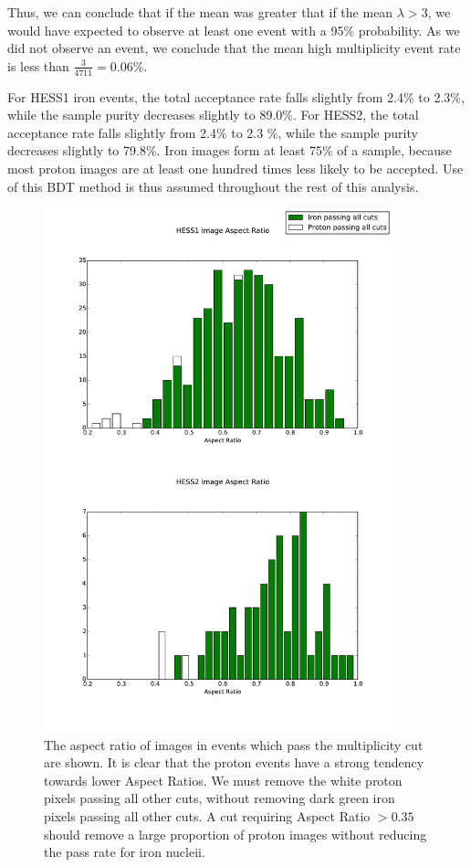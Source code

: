 \documentclass[11pt]{article}
\begin{document}
Thus, we can conclude that if the mean was greater that if the mean $\lambda>3$, we would have expected to observe at least one event with a 95\% probability. As we did not observe an event, we conclude that the mean high multiplicity event rate is less than $\frac{3}{4711}=0.06\%$. 

For HESS1 iron events, the total acceptance rate falls slightly from 2.4\% to 2.3\%, while the sample purity decreases slightly to 89.0\%. For HESS2, the total acceptance rate falls slightly from 2.4\% to 2.3 \%, while the sample purity decreases slightly to 79.8\%. Iron images form at least 75\% of a sample, because most proton images are at least one hundred times less likely to be accepted. Use of this BDT method is thus assumed throughout the rest of this analysis.

\begin{figure}
\begin{center}
\includegraphics[width=0.9\textwidth]{aspectratio}
\caption{The aspect ratio of images in events which pass the multiplicity cut are shown. It is clear that the proton events have a strong tendency towards lower Aspect Ratios. We must remove the white proton pixels passing all other cuts, without removing dark green iron pixels passing all other cuts. A cut requiring Aspect Ratio $> 0.35$ should remove a large proportion of proton images without reducing the pass rate for iron nucleii.}
\label{fig:aspectratio}
\end{center}
\end{figure}
\end{document}
